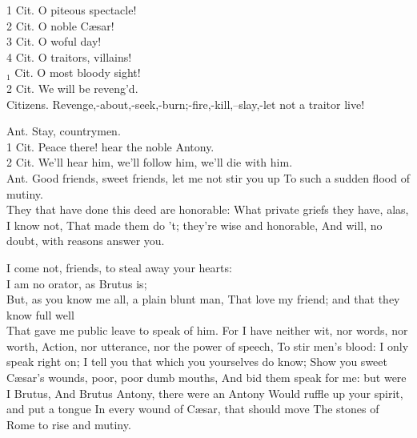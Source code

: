 \documentclass[10pt]{article}
\begin{document}
1 Cit. O piteous spectacle!\\
2 Cit. O noble Cæsar!\\
3 Cit. O woful day!\\
4 Cit. O traitors, villains!\\
${ }_{1}$ Cit. O most bloody sight!\\
2 Cit. We will be reveng'd.\\
Citizens. Revenge,-about,-seek,-burn;-fire,-kill,--slay,-let not a traitor live!

Ant. Stay, countrymen.\\
1 Cit. Peace there! hear the noble Antony.\\
2 Cit. We'll hear him, we'll follow him, we'll die with him.\\
Ant. Good friends, sweet friends, let me not stir you up To such a sudden flood of mutiny.\\
They that have done this deed are honorable: What private griefs they have, alas, I know not, That made them do 't; they're wise and honorable, And will, no doubt, with reasons answer you.

I come not, friends, to steal away your hearts:\\
I am no orator, as Brutus is;\\
But, as you know me all, a plain blunt man, That love my friend; and that they know full well\\
That gave me public leave to speak of him. For I have neither wit, nor words, nor worth, Action, nor utterance, nor the power of speech, To stir men's blood: I only speak right on; I tell you that which you yourselves do know; Show you sweet Cæsar's wounds, poor, poor dumb mouths, And bid them speak for me: but were I Brutus, And Brutus Antony, there were an Antony Would ruffle up your spirit, and put a tongue In every wound of Cæsar, that should move The stones of Rome to rise and mutiny.
\end{document}
